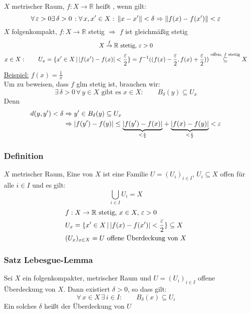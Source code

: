 $X$ metrischer Raum, $f:X \to \mathbb{R}$ heißt , wenn gilt:
\[
	\forall\, \varepsilon>0 \exists\, \delta >0 \,: \forall\, x,x' \in X: \, \norm{x-x'}<\delta \Rightarrow \norm{f(x)-f(x')}<\varepsilon
\]
$X$ folgenkompakt, $f:X \to \mathbb{R}$ stetig $\Rightarrow $ $f$ ist gleichmäßig stetig
\begin{gather*}
	X \stackrel{f}{\to} \mathbb{R} \text{ stetig, } \varepsilon>0 \\
	x \in X: \qquad U_x = \{x' \in X \,|\,\lvert f(x')-f(x)\rvert< \frac{\varepsilon}{2} \} = f^{-1}((f(x)-\frac{\varepsilon}{2},f(x)+\frac{\varepsilon}{2})) 
	\stackrel{\text{offen, $f$ stetig}}{\subseteq } X
\end{gather*}
\underline{Beispiel:} $f(x)=\frac{1}{x}$ \\
Um zu beweisen, dass $f$ glm stetig ist, brauchen wir:
\[
	\exists\, \delta >0 \,\forall\, y \in X \text{ gibt es } x \in X: \qquad B_{\delta}(y)\subseteq U_x 
\]
Denn 
\begin{align*}
	d(y,y')<\delta &\Rightarrow y' \in B_{\delta}(y) \subseteq U_x \\
					& \Rightarrow  \lvert f(y')-f(y)\rvert \leq \underset{<\frac{\varepsilon}{2}}{\underbrace{\lvert f(y')-f(x)\rvert}} +
					 \underset{<\frac{\varepsilon}{2}}{\underbrace{\lvert f(x)-f(y)\rvert}} < \varepsilon
\end{align*}
 \subsubsection{Definition} %
 \label{ssub:definition}
 $X$ metrischer Raum, Eine  von $X$ ist eine Familie $U=(U_i)_{i \in I}$, $U_i \subseteq X$ offen für alle $i \in I$ und es gilt:
 \[
 	\bigcup\limits_{i \in I}U_i = X
 \]
 \begin{align*}
 	&f:X \to \mathbb{R} \text{ stetig, } x \in X, \,\varepsilon>0 \\
	&U_x = \{ x' \in X \,|\,\lvert f(x)-f(x')\rvert< \frac{\varepsilon}{2} \} \subseteq X \\
	&(U_x)_{x \in X} = U \text{ offene Überdeckung von }X
 \end{align*}
 \subsubsection{Satz Lebesgue-Lemma} %
 \label{ssub:satz_lebesgue_lemma}
 Sei $X$ ein folgenkompakter, metrischer Raum und $U=(U_i)_{i \in I}$ offene Überdeckung von $X$. Dann existiert $\delta >0$, so dass gilt:
 \[
 	\forall\, x \in X \, \exists\,i \in I: \qquad B_{\delta}(x)\subseteq U_i
 \]
 Ein solches $\delta$ heißt  der Überdeckung von $U$
 
